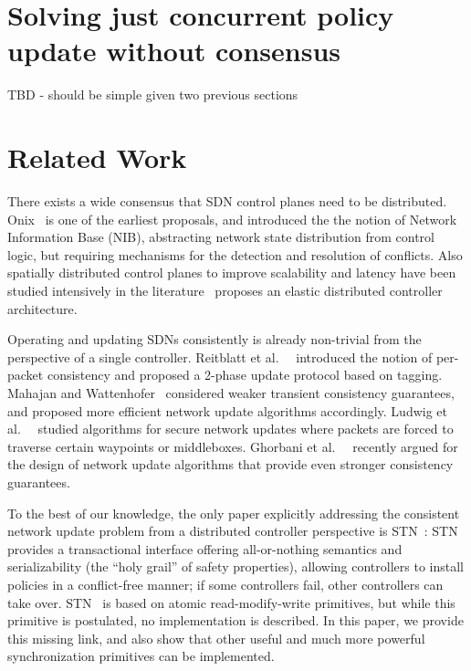 \documentclass[conference]{sigcomm-alternate}
\begin{document}
\section{Solving just concurrent policy update without consensus}\label{sec:todo}

TBD - should be simple given two previous sections


\section{Related Work}\label{sec:relwork}

There exists a wide consensus that SDN control planes need to be distributed.~\cite{onos,onix,elasticon} 
Onix~\cite{onix} is one of the earliest proposals, and introduced the 
the notion of Network Information Base (NIB), abstracting network state
distribution from control logic, but 
requiring mechanisms for the detection and resolution of conflicts. 
Also spatially distributed control planes to improve scalability and
latency have been studied intensively
in the literature~\cite{kandoo,ctrl-place,hotsdn13loc}
proposes an elastic distributed controller architecture. 

Operating and updating SDNs consistently is already non-trivial
from the perspective of a single controller. Reitblatt et al.~~\cite{network-update} 
introduced the notion of
per-packet consistency and proposed a 2-phase update protocol based on tagging.
Mahajan and Wattenhofer~\cite{roger-hotnets} considered weaker transient
consistency guarantees, and proposed more efficient network update algorithms
accordingly. Ludwig et al.~~\cite{hotnets14update} studied algorithms for secure
network updates where packets are forced to traverse certain waypoints or
middleboxes. Ghorbani et al.~~\cite{correct-virt} recently argued for the design
of network update algorithms that provide even stronger consistency guarantees.

To the best of our knowledge, the only paper explicitly addressing the consistent
network update problem from a distributed controller perspective is STN~\cite{stn}:
STN provides a transactional interface offering all-or-nothing semantics and serializability
(the ``holy grail'' of safety properties), 
allowing
controllers to install policies in a conflict-free manner; if some controllers fail,
other controllers can take over. STN~\cite{stn} is based on 
atomic
read-modify-write primitives, but while this primitive is postulated, no implementation is
described. In this paper, we provide this missing link, and also show that other useful and
much more powerful synchronization primitives can be implemented. 
\end{document}
